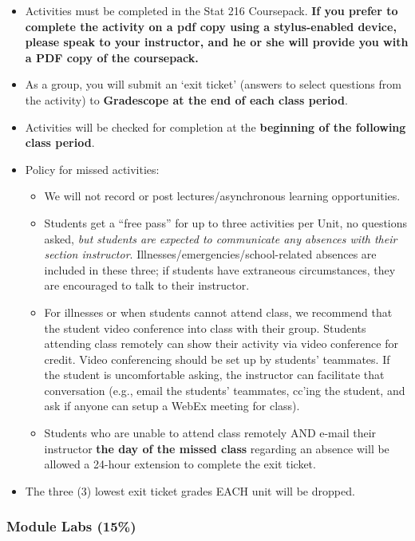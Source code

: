 \documentclass[
]{article}
\providecommand{\tightlist}{%
  \setlength{\itemsep}{0pt}\setlength{\parskip}{0pt}}
\begin{document}
\begin{itemize}
\tightlist
\item
  Activities must be completed in the Stat 216 Coursepack. \textbf{If
  you prefer to complete the activity on a pdf copy using a
  stylus-enabled device, please speak to your instructor, and he or she
  will provide you with a PDF copy of the coursepack.}
\item
  As a group, you will submit an `exit ticket' (answers to select
  questions from the activity) to \textbf{Gradescope at the end of each
  class period}.
\item
  Activities will be checked for completion at the \textbf{beginning of
  the following class period}.
\item
  Policy for missed activities:

  \begin{itemize}
  \tightlist
  \item
    We will not record or post lectures/asynchronous learning
    opportunities.
  \item
    Students get a ``free pass'' for up to three activities per Unit, no
    questions asked, \emph{but students are expected to communicate any
    absences with their section instructor}.
    Illnesses/emergencies/school-related absences are included in these
    three; if students have extraneous circumstances, they are
    encouraged to talk to their instructor.
  \item
    For illnesses or when students cannot attend class, we recommend
    that the student video conference into class with their group.
    Students attending class remotely can show their activity via video
    conference for credit. Video conferencing should be set up by
    students' teammates. If the student is uncomfortable asking, the
    instructor can facilitate that conversation (e.g., email the
    students' teammates, cc'ing the student, and ask if anyone can setup
    a WebEx meeting for class).
  \item
    Students who are unable to attend class remotely AND e-mail their
    instructor \textbf{the day of the missed class} regarding an absence
    will be allowed a 24-hour extension to complete the exit ticket.
  \end{itemize}
\item
  The three (3) lowest exit ticket grades EACH unit will be dropped.
\end{itemize}

\subsubsection{Module Labs (15\%)}\label{module-labs-15}
\end{document}
